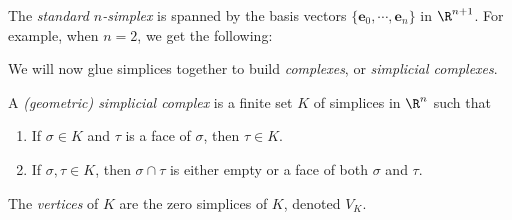 \documentclass[a4paper]{article}
\begin{document}
\begin{eg}
  The \emph{standard $n$-simplex} is spanned by the basis vectors $\{\mathbf{e}_0, \cdots, \mathbf{e}_n\}$ in $\R^{n + 1}$. For example, when $n = 2$, we get the following:
  \begin{center}
  \end{center}
\end{eg}

We will now glue simplices together to build \emph{complexes}, or \emph{simplicial complexes}.

\begin{defi}
  A \emph{(geometric) simplicial complex} is a finite set $K$ of simplices in $\R^n$ such that
  \begin{enumerate}
    \item If $\sigma \in K$ and $\tau$ is a face of $\sigma$, then $\tau \in K$.
    \item If $\sigma, \tau \in K$, then $\sigma \cap \tau$ is either empty or a face of both $\sigma$ and $\tau$.
  \end{enumerate}
\end{defi}

\begin{defi}[Vertices]
  The \emph{vertices} of $K$ are the zero simplices of $K$, denoted $V_K$.
\end{defi}
\end{document}
